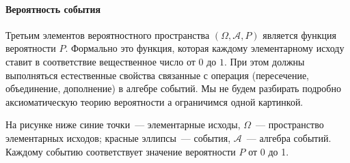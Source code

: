 \documentclass[11pt]{article}
\begin{document}
\paragraph{Вероятность события} Третьим элементов вероятностного пространства $(\Omega, \mathcal{A}, P)$ является функция вероятности $P$. Формально это функция, которая каждому элементарному исходу ставит в соответствие вещественное число от $0$ до $1$. При этом должны выполняться естественные свойства связанные с операция (пересечение, объединение, дополнение) в алгебре событий. Мы не будем разбирать подробно аксиоматическую теорию вероятности а ограничимся одной картинкой.

На рисунке ниже синие точки~--- элементарные исходы, $\Omega$~--- пространство элементарных исходов; красные эллипсы~--- события, $\mathcal{A}$~--- алгебра событий. Каждому событию соответствует значение вероятности $P$ от 0 до 1.
\end{document}
